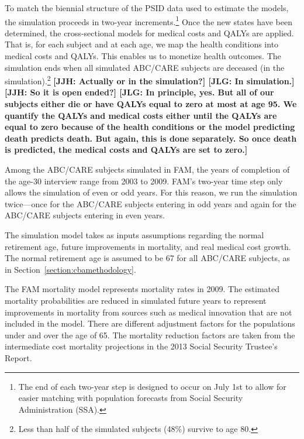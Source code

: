 \noindent To match the biennial structure of the PSID data used to estimate the models, the simulation proceeds in two-year increments.\footnote{The end of each two-year step is designed to occur on July 1st to allow for easier matching with population forecasts from Social Security Administration (SSA).}
Once the new states have been determined, the cross-sectional models for medical costs and QALYs are applied. That is, for each subject and at each age, we map the health conditions into medical costs and QALYs. This enables us to monetize health outcomes. The simulation ends when all simulated ABC/CARE subjects are deceased (in the simulation).\footnote{Less than half of the simulated subjects (48\%) survive to age 80.} \textbf{[JJH: Actually or in the simulation?] [JLG: In simulation.] [JJH: So it is open ended?] [JLG: In principle, yes. But all of our subjects either die or have QALYs equal to zero at most at age 95. We quantify the QALYs and medical costs either until the QALYs are equal to zero because of the health conditions or the model predicting death predicts death. But again, this is done separately. So once death is predicted, the medical costs and QALYs are set to zero.]}

\noindent Among the ABC/CARE subjects simulated in FAM, the years of completion of the age-30 interview range from 2003 to 2009. FAM's two-year time step only allows the simulation of even or odd years. For this reason, we run the simulation twice---once for the ABC/CARE subjects entering in odd years and again for the ABC/CARE subjects entering in even years.

\noindent The simulation model takes as inputs assumptions regarding the normal retirement age, future improvements in mortality, and real medical cost growth. The normal retirement age is assumed to be 67 for all ABC/CARE subjects, as in Section~\ref{section:cbamethodology}.

\noindent The FAM mortality model represents mortality rates in 2009. The estimated mortality probabilities are reduced in simulated future years to represent improvements in mortality from sources such as medical innovation that are not included in the model. There are different adjustment factors for the populations under and over the age of 65. The mortality reduction factors are taken from the intermediate cost mortality projections in the 2013 Social Security Trustee's Report.

